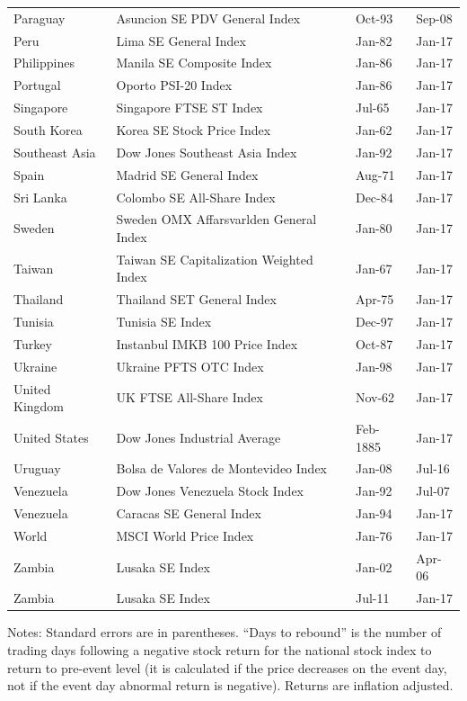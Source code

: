 \documentclass[12pt,final,fleqn]{article}
\theoremstyle{plain}
\begin{document}
\begin{table}[!ht]
\begin{center}
\begin{threeparttable}
\begin{tabular*}{\textwidth}{l@{\extracolsep{\fill}}lll}
Paraguay & Asuncion SE PDV General Index & Oct-93 & Sep-08\\
Peru & Lima SE General Index & Jan-82 & Jan-17\\
Philippines & Manila SE Composite Index & Jan-86 & Jan-17\\
Portugal & Oporto PSI-20 Index & Jan-86 & Jan-17\\
Singapore & Singapore FTSE ST Index & Jul-65 & Jan-17\\
South Korea & Korea SE Stock Price Index  & Jan-62 & Jan-17\\
Southeast Asia & Dow Jones Southeast Asia Index & Jan-92 & Jan-17\\
Spain & Madrid SE General Index & Aug-71 & Jan-17\\
Sri Lanka & Colombo SE All-Share Index & Dec-84 & Jan-17\\
Sweden & Sweden OMX Affarsvarlden General Index & Jan-80 & Jan-17\\
Taiwan & Taiwan SE Capitalization Weighted Index & Jan-67 & Jan-17\\
Thailand & Thailand SET General Index & Apr-75 & Jan-17\\
Tunisia & Tunisia SE Index & Dec-97 & Jan-17\\
Turkey & Instanbul IMKB 100 Price Index & Oct-87 & Jan-17\\
Ukraine & Ukraine PFTS OTC Index & Jan-98 & Jan-17\\
United Kingdom & UK FTSE All-Share Index & Nov-62 & Jan-17\\
United States & Dow Jones Industrial Average & Feb-1885 & Jan-17\\
Uruguay & Bolsa de Valores de Montevideo Index & Jan-08 & Jul-16\\
Venezuela & Dow Jones Venezuela Stock Index & Jan-92 & Jul-07\\
Venezuela & Caracas SE General Index & Jan-94 & Jan-17\\
World & MSCI World Price Index & Jan-76 & Jan-17\\
Zambia & Lusaka SE Index & Jan-02 & Apr-06\\
Zambia & Lusaka SE Index & Jul-11 & Jan-17\\
   \hline
   \hline
\end{tabular*}
\scriptsize
Notes: Standard errors are in parentheses. ``Days to rebound'' is the number of trading days following a negative stock return for the national stock index to return to pre-event level (it is calculated if the price decreases on the event day, not if the event day abnormal return is negative). Returns are inflation adjusted. 
\end{threeparttable}
\end{center}
\end{table}
\end{document}
